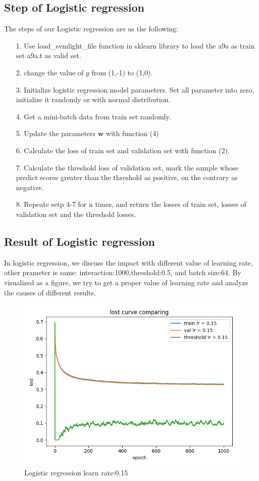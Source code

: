 \documentclass[journal, a4paper]{IEEEtran}
\begin{document}
\subsection{Step of Logistic regression}
The steps of our Logistic regression are as the following:
\begin{itemize}
\item[1.] Use load\_svmlight\_file function in sklearn library to load the a9a as train set a9a.t as valid set.
\item[2.] change the value of $y$ from (1,-1) to (1,0).
\item[3.]Initialize logistic regression model parameters. Set all parameter into zero, initialize it randomly or with normal distribution.
\item[4.] Get a mini-batch data from train set randomly.
\item[5.] Update the parameters $\boldsymbol{w}$ with function (4)
\item[6.] Calculate the loss of train set and validation set with function (2).
\item[7.] Calculate the threshold loss of validation set, mark the sample whose predict scores greater than the threshold as positive, on the contrary as negative.
\item[8.] Repeate setp 4-7 for n times, and return the losses of train set, losses of validation set and the threshold losses.
\end{itemize}

\subsection{Result of Logistic regression}
In logistic regression, we discuss the impact with different value of learning rate, other prameter is same: interaction:1000,threshold:0.5, and batch size:64. By visualized as a figure, we try to get a proper value of learning rate and analyze the causes of different results. 
\begin{figure}[!htb]
	\begin{center}
	\includegraphics[width=\columnwidth]{logr_15}
	\caption{Logistic regression learn rate:0.15}
	\label{fig:logr_15}
	\end{center}
\end{figure}
\end{document}

